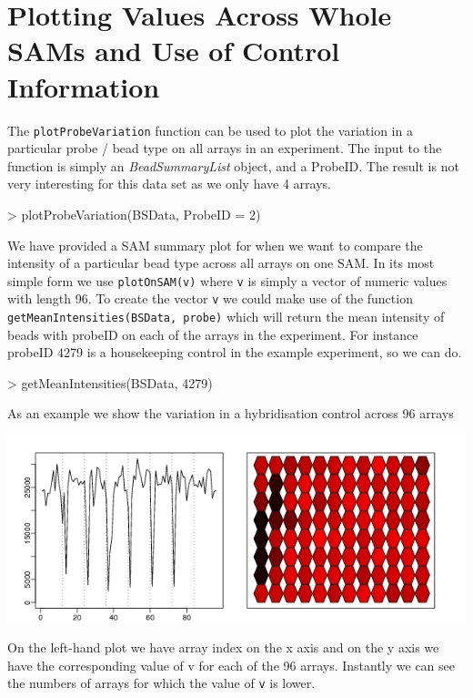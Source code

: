 \documentclass[a4paper]{article}
\newcommand{\Robject}[1]{{\texttt{#1}}}
\newcommand{\Rfunction}[1]{{\texttt{#1}}}
\newcommand{\Rclass}[1]{{\textit{#1}}}
\begin{document}
\section{Plotting Values Across Whole SAMs and Use of Control Information}
\label{plotting_across_arrays}

The \Rfunction{plotProbeVariation} function can be used to plot the
variation in a particular probe / bead type on all arrays in an
experiment. The input to the function is simply an
\Rclass{BeadSummaryList} object, and a ProbeID. The result is not very
interesting for this data set as we only have 4 arrays.

\begin{Schunk}
\begin{Sinput}
> plotProbeVariation(BSData, ProbeID = 2)
\end{Sinput}
\end{Schunk}


We have provided a SAM summary plot for when we want to compare the intensity of a particular bead type across all arrays on one SAM. In its most simple form we use \Rfunction{plotOnSAM(v)} where \Robject{v}
is simply a vector of numeric values with length 96. To create the vector \Robject{v} we could make use of the function \Rfunction{getMeanIntensities(BSData, probe)} which will return the mean intensity of beads with probeID on each of the
arrays in the experiment. For instance probeID 4279 is a housekeeping control in the example experiment, so we can do.

\begin{Schunk}
\begin{Sinput}
> getMeanIntensities(BSData, 4279)
\end{Sinput}
\end{Schunk}

As an example we show the variation in a hybridisation control across 96 arrays

\includegraphics{testpdf2.jpg}

On the left-hand plot we have array index on the x axis and on the y axis we have the corresponding value of v for each of the 96 arrays. Instantly we can see the numbers of arrays for which the value of \Robject{v} is lower.
\end{document}
